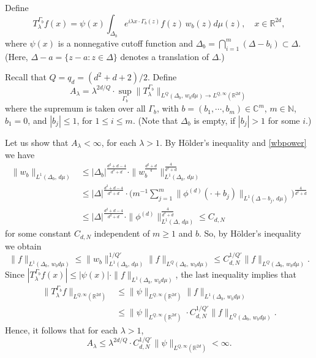 \documentclass[11 pt]{amsart}
\theoremstyle{plain}
\numberwithin{equation}{section}
\theoremstyle{plain}
\numberwithin{equation}{section}
\theoremstyle{remark}
\begin{document}
Define
\begin{equation}\label{Tla-d}
T_{\lambda}^{\Gamma_b} f(x)=  \psi(x) \int_{\Delta_b} e^{i{\lambda} x\cdot
\Gamma_b (z)} f(z) \, w_b (z) d\mu(z), \quad x\in {{\mathbb {R}}}^{2d} ,
\end{equation}
where $\psi(x)$ is a nonnegative cutoff function and $\Delta_b =
\bigcap_{i=1}^m (\Delta - b_i) \subset \Delta$. (Here, $\Delta -
a = \{ z - a  : z \in \Delta \}$ denotes a translation of $\Delta$.)

Recall that $Q =q_d =(d^2 +d +2)/2$. Define
\begin{equation}\label{Al-d}
A_{\lambda} = {\lambda}^{2d/Q} \cdot \sup_{\Gamma_b}\| T_{\lambda}^{\Gamma_b}
\|_{L^{Q}(\Delta_b, \, w_b d\mu )\rightarrow L^{Q,\infty}({{\mathbb {R}}}^{2d})}
\end{equation}
where the supremum is taken over all $\Gamma_b$, with $b= (b_1, \cdots, b_m) \in {{\mathbb {C}}}^{m}$, $m \in \mathbb{N}$, $b_1=0$, and $|b_j|\le 1$, for $1 \le i \le m$. (Note that $\Delta_b$ is empty, if $|b_j|>1$ for some $i$.)

Let us show that $A_{\lambda} < \infty$, for each ${\lambda} >1$. By
H\"older's inequality and \eqref{wbpower} we have
\begin{align*}
 \| w_b \|_{L^1(\Delta_b , \, d\mu )} &\le |\Delta_b|^{\frac{d^2+d-4}{d^2+d}}\cdot \| w_b^{\frac{d^2+d}{4}} \|_{L^1(\Delta_b , \, d\mu
)}^{\frac{4}{d^2+d}} \\
&\le | \Delta |^{\frac{d^2+d-4}{d^2+d}} \cdot \Big( m^{-1} \sum_{j=1}^m \| \phi^{(d)}(\cdot+b_j)\|_{L^1(\Delta-b_j , \, d\mu
)} \Big)^{\frac{4}{d^2+d}}\\
&\le | \Delta |^{\frac{d^2+d-4}{d^2+d}} \cdot \| \phi^{(d)}\|_{L^1(\Delta , \, d\mu
)}^{\frac{4}{d^2+d}} \le C_{d,N}
\end{align*}
for some constant $C_{d,N}$ independent of $m \ge 1$ and $b$. So, by H\"older's inequality we
obtain
$$ \| f\|_{L^1 (\Delta_b , \, w_b d\mu )} \le
\| w_b \|_{L^1(\Delta_b , \, d\mu )}^{1/Q'} \| f\|_{L^{Q}(\Delta_b,
\, w_b d\mu )} \le C_{d,N}^{1/Q'} \| f\|_{L^{Q}(\Delta_b, \, w_b d\mu
)} .$$
Since $| T_{\lambda}^{\Gamma_b} f (x)| \le |\psi(x)| \cdot \| f\|_{L^1 (\Delta_b , \, w_b d\mu )}
$, the last inequality implies that
\begin{align*}
\| T_{\lambda}^{\Gamma_b} f \|_{L^{Q,\infty}({{\mathbb {R}}}^{2d})} &\le \|
\psi \|_{L^{Q,\infty}({{\mathbb {R}}}^{2d})} \| f\|_{L^1 (\Delta_b , \, w_b d\mu )}\\
& \le \|\psi \|_{L^{Q,\infty}({{\mathbb {R}}}^{2d})} \cdot C_{d,N}^{1/Q'} \| f\|_{L^{Q}(\Delta_b, \, w_b d\mu
)} .
\end{align*}
Hence, it follows that for each ${\lambda} >1$,
\begin{equation}\label{Alafinite-d} A_{\lambda} \le {\lambda}^{2d/Q}\cdot
C_{d,N}^{1/Q'} \|\psi\|_{L^{Q,\infty}({{\mathbb {R}}}^{2d})}  < \infty .
\end{equation}
\end{document}
